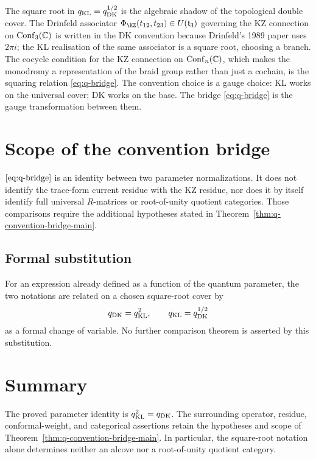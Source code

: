 \begin{remark}
\label{rem:q-bridge-square-root}
The square root in $q_{\mathrm{KL}} = q_{\mathrm{DK}}^{1/2}$ is the algebraic
shadow of the topological double cover. The Drinfeld associator
$\Phi_{\KZ}(t_{12}, t_{23}) \in U(\mathfrak{t}_{3})$ governing
the KZ connection on $\mathrm{Conf}_{3}(\mathbb{C})$ is written in
the DK convention because Drinfeld's 1989 paper uses $2\pi i$;
the KL realisation of the same associator is a square root,
choosing a branch. The cocycle condition for the KZ connection
on $\mathrm{Conf}_{n}(\mathbb{C})$, which makes the monodromy a representation
of the braid group rather than just a cochain, is the squaring
relation \eqref{eq:q-bridge}. The convention choice is a gauge
choice: KL works on the universal cover; DK works on the base.
The bridge \eqref{eq:q-bridge} is the gauge transformation
between them.
\end{remark}

\section{Scope of the convention bridge}
\label{sec:q-bridge-propagation}

\(\eqref{eq:q-bridge}\) is an identity between two parameter
normalizations.  It does not identify the trace-form current residue with
the KZ residue, nor does it by itself identify full universal
\(R\)-matrices or root-of-unity quotient categories.  Those comparisons
require the additional hypotheses stated in
Theorem~\ref{thm:q-convention-bridge-main}.

\subsection{Formal substitution}
\label{sec:q-bridge-protocol}

For an expression already defined as a function of the quantum parameter,
the two notations are related on a chosen square-root cover by
\[
 q_{\mathrm{DK}}=q_{\mathrm{KL}}^{2},\qquad
 q_{\mathrm{KL}}=q_{\mathrm{DK}}^{1/2}
\]
as a formal change of variable.  No further comparison theorem is asserted
by this substitution.

\section{Summary}
\label{sec:q-bridge-summary}

The proved parameter identity is \(q_{\mathrm{KL}}^{2}=q_{\mathrm{DK}}\).  The surrounding
operator, residue, conformal-weight, and categorical assertions retain the
hypotheses and scope of Theorem~\ref{thm:q-convention-bridge-main}.  In
particular, the square-root notation alone determines neither an alcove nor
a root-of-unity quotient category.
